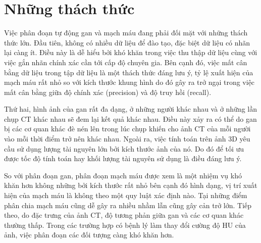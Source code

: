 \section{Những thách thức}
Việc phân đoạn tự động gan và mạch máu đang phải đối mặt với những thách thức lớn. Đầu tiên, không có nhiều dữ liệu để đào tạo, đặc biệt dữ liệu có nhãn lại càng ít. Điều này là dễ hiểu bởi khó khăn trong việc thu thập dữ liệu cùng với việc gắn nhãn chính xác cần tới cấp độ chuyên gia. Bên cạnh đó, việc mất cân bằng dữ liệu trong tập dữ liệu là một thách thức đáng lưu ý, tỷ lệ xuất hiện của mạch máu rất nhỏ so với kích thước khung hình do đó gây ra trở ngại trong việc mất cân bằng giữa độ chính xác (precision) và độ truy hồi (recall). 

Thứ hai, hình ảnh của gan rất đa dạng, ở những người khác nhau và ở những lần chụp CT khác nhau sẽ đem lại kết quả khác nhau. Điều này xảy ra có thể do gan bị các cơ quan khác đè nén lên trong lúc chụp khiến cho ảnh CT của mỗi người vào mỗi thời điểm trở nên khác nhau.
\newpage
Ngoài ra, việc tính toán trên ảnh 3D yêu cầu sử dụng lượng tài nguyên lớn bởi kích thước ảnh của nó. Do đó để tối ưu được tốc độ tính toán hay khối lượng tài nguyên sử dụng là điều đáng lưu ý.

So với phân đoạn gan, phân đoạn mạch máu được xem là một nhiệm vụ khó khăn hơn không những bởi kích thước rất nhỏ bên cạnh đó hình dạng, vị trí xuất hiện của mạch máu là không theo một quy luật xác định nào. Tại những điểm phân chia mạch máu cũng dễ gây ra nhiều nhầm lẫn cũng gây cản trở lớn. Tiếp theo, do đặc trưng của ảnh CT, độ tương phản giữa gan và các cơ quan khác thường thấp. Trong các trường hợp có bệnh lý làm thay đổi cường độ HU của ảnh, việc phân đoạn các đối tượng càng khó khăn hơn. 
